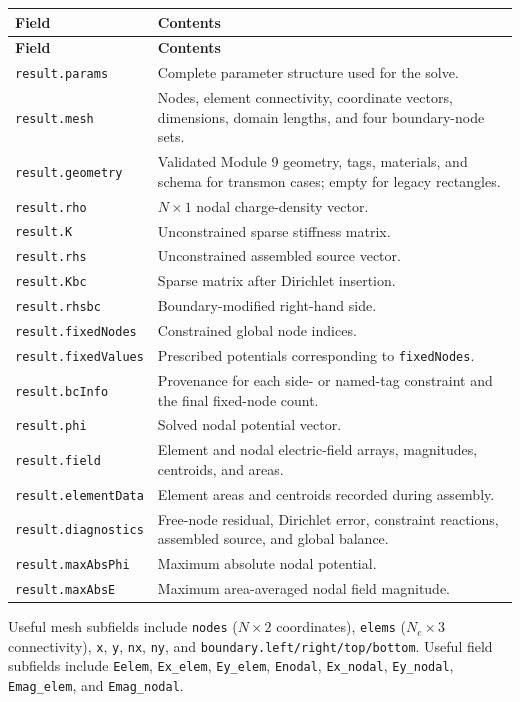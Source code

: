 \documentclass[11pt]{article}
\begin{document}
\begin{longtable}{p{} p{}}
\toprule
\textbf{Field} & \textbf{Contents} \\
\midrule
\endfirsthead
\toprule
\textbf{Field} & \textbf{Contents} \\
\midrule
\endhead
\texttt{result.params} & Complete parameter structure used for the solve. \\
\texttt{result.mesh} & Nodes, element connectivity, coordinate vectors, dimensions, domain lengths, and four boundary-node sets. \\
\texttt{result.geometry} & Validated Module 9 geometry, tags, materials, and schema for transmon cases; empty for legacy rectangles. \\
\texttt{result.rho} & $N\times1$ nodal charge-density vector. \\
\texttt{result.K} & Unconstrained sparse stiffness matrix. \\
\texttt{result.rhs} & Unconstrained assembled source vector. \\
\texttt{result.Kbc} & Sparse matrix after Dirichlet insertion. \\
\texttt{result.rhsbc} & Boundary-modified right-hand side. \\
\texttt{result.fixedNodes} & Constrained global node indices. \\
\texttt{result.fixedValues} & Prescribed potentials corresponding to \texttt{fixedNodes}. \\
\texttt{result.bcInfo} & Provenance for each side- or named-tag constraint and the final fixed-node count. \\
\texttt{result.phi} & Solved nodal potential vector. \\
\texttt{result.field} & Element and nodal electric-field arrays, magnitudes, centroids, and areas. \\
\texttt{result.elementData} & Element areas and centroids recorded during assembly. \\
\texttt{result.diagnostics} & Free-node residual, Dirichlet error, constraint reactions, assembled source, and global balance. \\
\texttt{result.maxAbsPhi} & Maximum absolute nodal potential. \\
\texttt{result.maxAbsE} & Maximum area-averaged nodal field magnitude. \\
\bottomrule
\end{longtable}

Useful mesh subfields include \texttt{nodes} ($N\times2$ coordinates), \texttt{elems} ($N_e\times3$ connectivity), \texttt{x}, \texttt{y}, \texttt{nx}, \texttt{ny}, and \texttt{boundary.left/right/top/bottom}. Useful field subfields include \texttt{Eelem}, \texttt{Ex\_elem}, \texttt{Ey\_elem}, \texttt{Enodal}, \texttt{Ex\_nodal}, \texttt{Ey\_nodal}, \texttt{Emag\_elem}, and \texttt{Emag\_nodal}.
\end{document}
